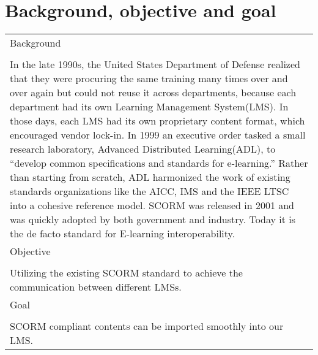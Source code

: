 \documentclass{report}
\begin{document}
\section{Background, objective and goal}
\begin{table}[h]
	\begin{tabularx}{\textwidth}{| X |}

	\hline
	Background \\
	\\
	In the late 1990s, the United States Department of Defense realized that they were procuring the same training many times over and over again but 
	could not reuse it across departments, because each department had its own Learning Management System(LMS). In those days, each LMS had its own 
	proprietary content format, which encouraged vendor lock-in. In 1999 an executive order tasked a small research laboratory, Advanced Distributed 
	Learning(ADL), to ``develop common specifications and standards for e-learning.'' Rather than starting from scratch, ADL harmonized the work of 
	existing standards organizations like the AICC, IMS and the IEEE LTSC into a cohesive reference model. SCORM was released in 2001 and was quickly 
	adopted by both government and industry. Today it is the de facto standard for E-learning interoperability. \\ [1ex]

	\hline
		Objective \\
		\\
		Utilizing the existing SCORM standard to achieve the communication between different LMSs. \\ [1ex]
	
	\hline
		Goal \\
		\\
		SCORM compliant contents can be imported smoothly into our LMS. \\  [1ex]


	\hline

\end{tabularx}
\end{table}

\newpage
\end{document}

